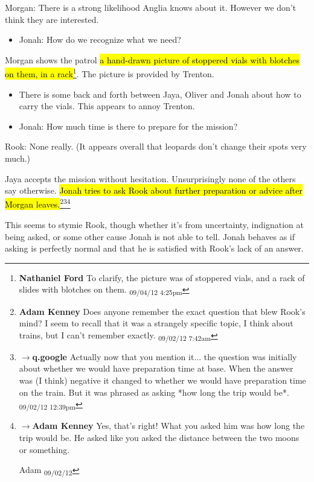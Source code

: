 {Morgan: There is a strong likelihood Anglia knows about it.  However we don't think they are interested.

\begin{itemize}
\item Jonah: How do we recognize what we need?
\end{itemize}

Morgan shows the patrol \hl{a hand-drawn picture of stoppered vials with blotches on them, in a rack}\footnote{\textbf{Nathaniel Ford }To clarify, the picture was of stoppered vials, and a rack of slides with blotches on them. \textsubscript{09/04/12 4:25pm}}.  The picture is provided by Trenton.

\begin{itemize}
\item There is some back and forth between Jaya, Oliver and Jonah about how to carry the vials.  This appears to annoy Trenton.
\item Jonah:  How much time is there to prepare for the mission?
\end{itemize}

Rook: None really.  (It appears overall that leopards don't change their spots very much.)
}


Jaya accepts the mission without hesitation.  Unsurprisingly none of the others say otherwise.  \hl{Jonah tries to ask Rook about further preparation or advice after Morgan leaves.}\footnote{\textbf{Adam Kenney }Does anyone remember the exact question that blew Rook's mind?  I seem to recall that it was a strangely specific topic, I think about trains, but I can't remember exactly. \textsubscript{09/02/12 7:42am}}\footnote{$\rightarrow$\textbf{q.google }Actually now that you mention it... the question was initially about whether we would have preparation time at base.  When the answer was (I think) negative it changed to whether we would have preparation time on the train.  But it was phrased as asking *how long the trip would be*. \textsubscript{09/02/12 12:39pm}}\footnote{$\rightarrow$\textbf{Adam Kenney }Yes, that's right!  What you asked him was how long the trip would be.  He 
asked like you asked the distance between the two moons or something. 

    Adam  \textsubscript{09/02/12}}
 
This seems to stymie Rook, though whether it's from uncertainty, indignation at being asked, or some other cause Jonah is not able to tell.   Jonah behaves as if asking is perfectly normal and that he is satisfied with Rook's lack of an answer.


